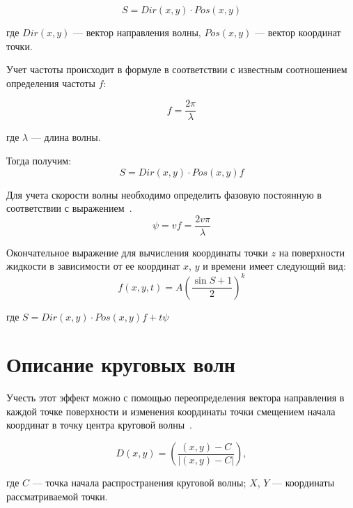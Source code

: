 \begin{equation}
    S = Dir(x,y)\cdot Pos(x,y)
\end{equation}

\begin{flushleft}
    где $Dir(x, y)$ — вектор направления волны, $Pos(x, y)$ — вектор координат точки.
\end{flushleft}


Учет частоты происходит в формуле в соответствии с известным соотношением определения частоты $f$:

\begin{equation}
    f = \dfrac{2\pi}{\lambda}
\end{equation}
\begin{flushleft}
где $\lambda$ — длина волны.
\end{flushleft}
Тогда получим:
\begin{equation}
    S = Dir(x,y)\cdot Pos(x,y)f
\end{equation}

Для учета скорости волны необходимо определить фазовую постоянную в соответствии с выражением~\cite{WAVE}.
\begin{equation}
    \psi = vf = \dfrac{2v\pi}{\lambda}
\end{equation}

Окончательное выражение для вычисления координаты точки $z$ на поверхности жидкости 
в зависимости от ее координат $x$, $y$ и времени имеет следующий вид:
\begin{equation}
    f(x,y,t) = A\left(\dfrac{\sin{S} + 1}{2}\right)^k
\end{equation}

\begin{flushleft}
где $S = Dir(x, y)\cdot Pos(x, y)f + t\psi$
\end{flushleft}

\section{Описание круговых волн}
Учесть этот эффект можно с помощью переопределения вектора направления в каждой точке поверхности 
и изменения координаты точки смещением начала координат в точку центра круговой волны~\cite{WAVE}.

\begin{equation}
        D(x,y) = \left(\dfrac{(x, y) - C}{|(x, y) - C|}\right),
\end{equation}
\begin{flushleft}
где $C$ --- точка начала распространения круговой волны; 
$X$, $Y$ --- координаты рассматриваемой точки.
\end{flushleft}

